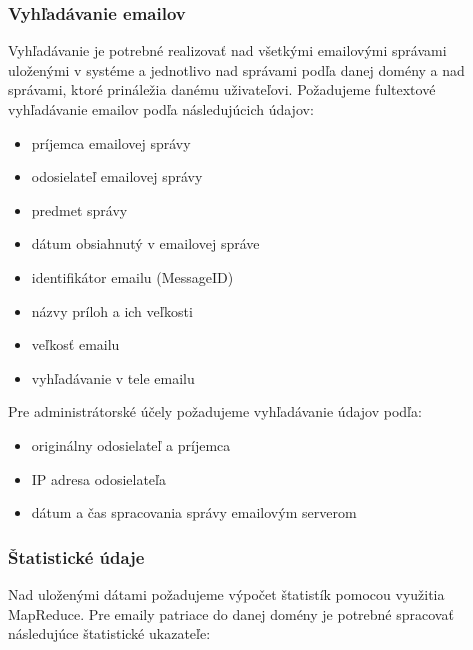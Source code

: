 \documentclass[11pt,twoside,a4paper]{book}
\begin{document}
\subsubsection*{Vyhľadávanie emailov}
Vyhľadávanie je potrebné realizovať nad všetkými emailovými správami uloženými v systéme a jednotlivo nad správami podľa danej domény a nad správami, ktoré prináležia danému uživateľovi. Požadujeme fultextové vyhľadávanie emailov podľa následujúcich údajov:
\begin{itemize}
 \item
  príjemca emailovej správy
 \item
  odosielateľ emailovej správy
 \item
  predmet správy
 \item
  dátum obsiahnutý v emailovej správe
 \item
  identifikátor emailu (MessageID)
 \item
  názvy príloh a ich veľkosti %
 \item
  veľkosť emailu
 \item
  vyhľadávanie v tele emailu
\end{itemize}

\newpage
\noindent
Pre administrátorské účely požadujeme vyhľadávanie údajov podľa: %
\begin{itemize}
 \item originálny odosielateľ a príjemca
 \item IP adresa odosielateľa
 \item dátum a čas spracovania správy emailovým serverom
\end{itemize}


\subsubsection*{Štatistické údaje}
Nad uloženými dátami požadujeme výpočet štatistík pomocou využitia MapReduce. Pre emaily patriace do danej domény je potrebné spracovať následujúce štatistické ukazateľe:
\end{document}
